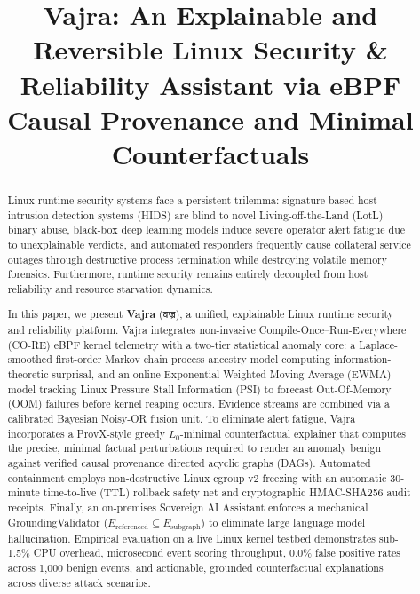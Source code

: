 \documentclass[conference]{IEEEtran}
\begin{document}
\title{Vajra: An Explainable and Reversible Linux Security \& Reliability Assistant via eBPF Causal Provenance and Minimal Counterfactuals}

\author{
}

\maketitle

\begin{abstract}
Linux runtime security systems face a persistent trilemma: signature-based host intrusion detection systems (HIDS) are blind to novel Living-off-the-Land (LotL) binary abuse, black-box deep learning models induce severe operator alert fatigue due to unexplainable verdicts, and automated responders frequently cause collateral service outages through destructive process termination while destroying volatile memory forensics. Furthermore, runtime security remains entirely decoupled from host reliability and resource starvation dynamics. 

In this paper, we present \textbf{Vajra} (वज्र), a unified, explainable Linux runtime security and reliability platform. Vajra integrates non-invasive Compile-Once--Run-Everywhere (CO-RE) eBPF kernel telemetry with a two-tier statistical anomaly core: a Laplace-smoothed first-order Markov chain process ancestry model computing information-theoretic surprisal, and an online Exponential Weighted Moving Average (EWMA) model tracking Linux Pressure Stall Information (PSI) to forecast Out-Of-Memory (OOM) failures before kernel reaping occurs. Evidence streams are combined via a calibrated Bayesian Noisy-OR fusion unit. To eliminate alert fatigue, Vajra incorporates a ProvX-style greedy $L_0$-minimal counterfactual explainer that computes the precise, minimal factual perturbations required to render an anomaly benign against verified causal provenance directed acyclic graphs (DAGs). Automated containment employs non-destructive Linux cgroup v2 freezing with an automatic 30-minute time-to-live (TTL) rollback safety net and cryptographic HMAC-SHA256 audit receipts. Finally, an on-premises Sovereign AI Assistant enforces a mechanical GroundingValidator ($E_{\text{referenced}} \subseteq E_{\text{subgraph}}$) to eliminate large language model hallucination. Empirical evaluation on a live Linux kernel testbed demonstrates sub-1.5\% CPU overhead, microsecond event scoring throughput, 0.0\% false positive rates across 1,000 benign events, and actionable, grounded counterfactual explanations across diverse attack scenarios.
\end{abstract}
\end{document}
